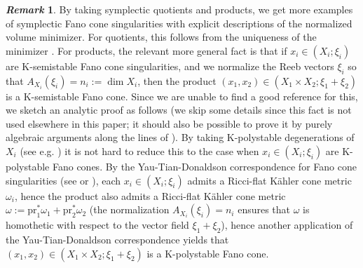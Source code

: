 \documentclass[12pt]{amsart}
\theoremstyle{definition}
\newtheorem{rem}[prop]{\it Remark}
\numberwithin{equation}{section}
\begin{document}
\begin{rem}
By taking symplectic quotients and products, we get more examples of symplectic Fano cone singularities with explicit descriptions of the normalized volume minimizer. For quotients, this follows from the uniqueness of the minimizer \cite{XZ-uniqueness}. For products, the relevant more general fact is that if $x_i\in (X_i;\xi_i)$ are K-semistable Fano cone singularities, and we normalize the Reeb vectors $\xi_i$ so that $A_{X_i}(\xi_i)=n_i:=\dim X_i$, then the product $(x_1,x_2)\in (X_1\times X_2;\xi_1+\xi_2)$ is a K-semistable Fano cone. Since we are unable to find a good reference for this, we sketch an analytic proof as follows (we skip some details since this fact is not used elsewhere in this paper; it should also be possible to prove it by purely algebraic arguments along the lines of \cite{Z-product-K,XZ-uniqueness}). By taking K-polystable degenerations of $X_i$ (see e.g. \cite{LWX-tangent-cone}) it is not hard to reduce this to the case when $x_i\in (X_i;\xi_i)$ are K-polystable Fano cones. By the Yau-Tian-Donaldson correspondence for Fano cone singularities (see \cite[Theorem 2.9]{Li-Fano-cone-YTD} or \cite[Theorem 1.0.8]{Huang-thesis}), each $x_i\in (X_i;\xi_i)$ admits a Ricci-flat K\"ahler cone metric $\omega_i$, hence the product also admits a Ricci-flat K\"ahler cone metric $\omega:=\mathrm{pr}_1^*\omega_1+\mathrm{pr}_2^*\omega_2$ (the normalization $A_{X_i}(\xi_i)=n_i$ ensures that $\omega$ is homothetic with respect to the vector field $\xi_1+\xi_2$), hence another application of the Yau-Tian-Donaldson correspondence yields that $(x_1,x_2)\in (X_1\times X_2;\xi_1+\xi_2)$ is a K-polystable Fano cone.

\end{rem}
\end{document}
